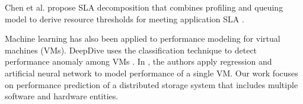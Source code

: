 Chen et al. propose SLA decomposition that combines profiling and queuing model to derive resource thresholds for meeting application SLA \cite{Chen2007}.


Machine learning has also been applied to performance modeling for virtual machines (VMs).
DeepDive uses the classification technique to detect performance anomaly among VMs \cite{Novakovic2013}.
In \cite{Kundu2010}, the authors apply regression and artificial neural network to model performance of a single VM.
Our work focuses on performance prediction of a distributed storage system that includes multiple software and hardware entities.
